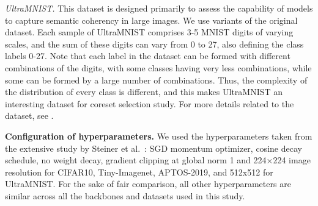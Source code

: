 \textit{UltraMNIST. }This dataset \citep{ultamnist2022} is designed primarily to assess the capability of models to capture semantic coherency in large images. We use  variants of the original dataset. Each sample of UltraMNIST comprises 3-5 MNIST digits of varying scales, and the sum of these digits can vary from 0 to 27, also defining the class labels 0-27. Note that each label in the dataset can be formed with different combinations of the digits, with some classes having very less combinations, while some can be formed by a large number of combinations. Thus, the complexity of the distribution of every class is different, and this makes UltraMNIST an interesting dataset for coreset selection study. For more details related to the dataset, see \cite{ultamnist2022}.




\textbf{Configuration of hyperparameters. } We used the hyperparameters taken from the extensive study by Steiner et al.~\citep{steiner2021train}: SGD momentum optimizer, cosine decay schedule, no weight decay, gradient clipping at global norm 1 and 224×224 image resolution for CIFAR10, Tiny-Imagenet, APTOS-2019, and 512x512 for UltraMNIST.
For the sake of fair comparison, all other hyperparameters are similar across all the backbones and datasets used in this study.








